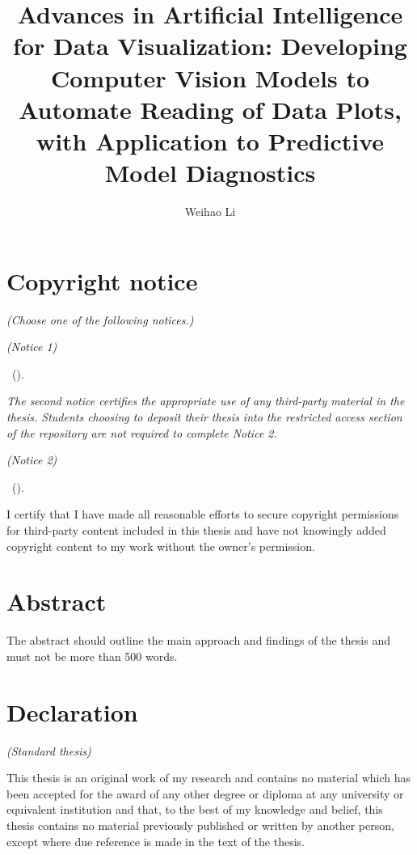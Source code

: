 \documentclass{monashthesis}
\author{Weihao Li}
\title{Advances in Artificial Intelligence for Data Visualization: Developing Computer Vision Models to Automate Reading of Data Plots, with Application to Predictive Model Diagnostics}
\theoremstyle{definition}
\theoremstyle{definition}
\theoremstyle{definition}
\theoremstyle{definition}
\theoremstyle{remark}
\begin{document}

\titlepage

{\sf\tighttoc\doublespacing}

\hypertarget{copyright-notice}{%
\chapter*{Copyright notice}\label{copyright-notice}}

\emph{(Choose one of the following notices.)}

\emph{(Notice 1)}

\textcopyright { } \authorname~(\number\the\year).

\emph{The second notice certifies the appropriate use of any third-party material in the thesis. Students choosing to deposit their thesis into the restricted access section of the repository are not required to complete Notice 2.}

\emph{(Notice 2)}

\textcopyright { } \authorname~(\number\the\year).

I certify that I have made all reasonable efforts to secure copyright permissions for third-party content included in this thesis and have not knowingly added copyright content to my work without the owner's permission.

\newpage

\hypertarget{abstract}{%
\chapter*{Abstract}\label{abstract}}

The abstract should outline the main approach and findings of the thesis and must not be more than 500 words.

\newpage

\hypertarget{declaration}{%
\chapter*{Declaration}\label{declaration}}

\emph{(Standard thesis)}

This thesis is an original work of my research and contains no material which has been accepted for the award of any other degree or diploma at any university or equivalent institution and that, to the best of my knowledge and belief, this thesis contains no material previously published or written by another person, except where due reference is made in the text of the thesis.
\end{document}
